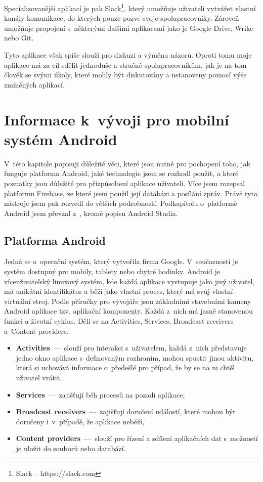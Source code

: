 Specializovanější aplikací je pak Slack\footnote{Slack -- https://slack.com}, který umožňuje uživateli vytvářet vlastní kanály komunikace, do kterých pouze pozve svoje spolupracovníky. Zároveň umožňuje propojení s~některými dalšími aplikacemi jako je Google Drive, Wrike nebo Git.

Tyto aplikace však spíše slouží pro diskuzi a výměnu názorů. Oproti tomu moje aplikace má za cíl sdělit jednoduše a stručně spolupracovníkům, jak je na tom člověk se svými úkoly, které mohly být diskutovány a ustanoveny pomocí výše zmíněných aplikací. 

\chapter{Informace k~vývoji pro mobilní systém Android}

V~této kapitole popisuji důležité věci, které jsou nutné pro pochopení toho, jak funguje platforma Android, jaké technologie jsem se rozhodl použít, a které poznatky jsou důležité pro přizpůsobení aplikace uživateli. Více jsem rozepsal platformu Firebase, ze které jsem použil její databázi a posílání zpráv. Právě tyto nástroje jsem pak rozvedl do větších podrobností. Podkapitolu o~platformě Android jsem převzal z~\cite{android}, kromě popisu Android Studia.

\section{Platforma Android}

Jedná se o~operační systém, který vytvořila firma Google. V~současnosti je systém dostupný pro mobily, tablety nebo chytré hodinky. Android je víceuživatelský linuxový systém, kde každá aplikace vystupuje jako jiný uživatel, má unikátní identifikátor a běží jako vlastní proces, který má svůj vlastní virtuální stroj. Podle příručky pro vývojáře \cite{android} jsou základními stavebními kameny Android aplikace tzv. aplikační komponenty. Každá z~nich má jasně stanovenou funkci a životní cyklus. Dělí se na Activities, Services, Broadcast receivers a~Content providers. 

\begin{itemize}
\item \textbf{Activities} \,---\, slouží pro interakci s~uživatelem, každá z~nich představuje jedno okno aplikace s~definovaným rozhraním, mohou spustit jinou aktivitu, která si uchovává informace o~předešlé pro případ, že by se na ni chtěl uživatel vrátit,
\item \textbf{Services} \,---\, zajišťují běh procesů na pozadí aplikace,
\item \textbf{Broadcast receivers} \,---\, zajišťují doručení událostí, které mohou být doručeny i~v~případě, že aplikace neběží,
\item \textbf{Content providers} \,---\, slouží pro řízení a sdílení aplikačních dat s~možností je uložit do souborů nebo databází.
\end{itemize}

